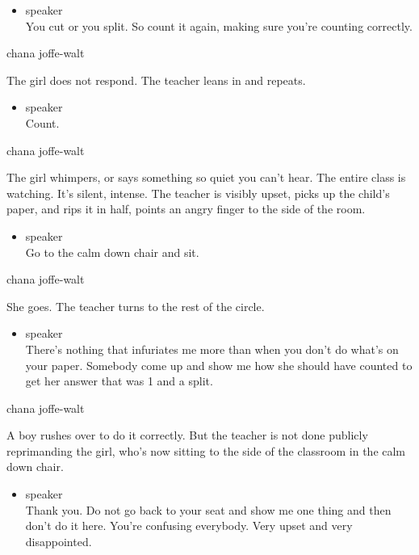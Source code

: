 \begin{itemize}
\tightlist
\item
  speaker\\
  You cut or you split. So count it again, making sure you're counting
  correctly.
\end{itemize}

chana joffe-walt

The girl does not respond. The teacher leans in and repeats.

\begin{itemize}
\tightlist
\item
  speaker\\
  Count.
\end{itemize}

chana joffe-walt

The girl whimpers, or says something so quiet you can't hear. The entire
class is watching. It's silent, intense. The teacher is visibly upset,
picks up the child's paper, and rips it in half, points an angry finger
to the side of the room.

\begin{itemize}
\tightlist
\item
  speaker\\
  Go to the calm down chair and sit.
\end{itemize}

chana joffe-walt

She goes. The teacher turns to the rest of the circle.

\begin{itemize}
\tightlist
\item
  speaker\\
  There's nothing that infuriates me more than when you don't do what's
  on your paper. Somebody come up and show me how she should have
  counted to get her answer that was 1 and a split.
\end{itemize}

chana joffe-walt

A boy rushes over to do it correctly. But the teacher is not done
publicly reprimanding the girl, who's now sitting to the side of the
classroom in the calm down chair.

\begin{itemize}
\tightlist
\item
  speaker\\
  Thank you. Do not go back to your seat and show me one thing and then
  don't do it here. You're confusing everybody. Very upset and very
  disappointed.
\end{itemize}

